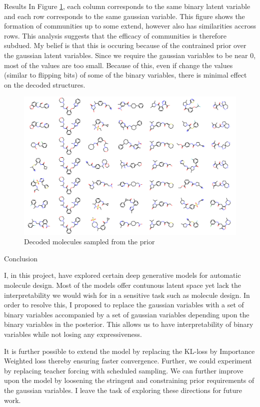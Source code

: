\documentclass{article}
\begin{document}
\begin{psection}{Results}
	In Figure \ref{fig:samples}, each column corresponds to the same binary latent variable and each row corresponds to the same gaussian variable. This figure shows the formation of communities up to some extend, however also has similarities accross rows. This analysis suggests that the efficacy of communities is therefore subdued. My belief is that this is occuring because of the contrained prior over the gaussian latent variables. Since we require the gaussian variables to be near 0, most of the values are too small. Because of this, even if change the values (similar to flipping bits) of some of the binary variables, there is minimal effect on the decoded structures.
	\begin{figure}[htpb]
		\centering
		\includegraphics[width=\textwidth]{includes/plots/plots.png}
		\caption{Decoded molecules sampled from the prior}
		\label{fig:samples}
	\end{figure}

\end{psection}

\begin{psection}{Conclusion}

	I, in this project, have explored certain deep generative models for automatic molecule design. Most of the models offer contunous latent space yet lack the interpretability we would wish for in a sensitive task such as molecule design. In order to resolve this, I proposed to replace the gaussian variables with a set of binary variables accompanied by a set of gaussian variables depending upon the binary variables in the posterior. This allows us to have interpretability of binary variables while not losing any expressiveness.

	It is further possible to extend the model by replacing the KL-loss by Importance Weighted loss thereby ensuring faster convergence. Further, we could experiment by replacing teacher forcing with scheduled sampling. We can further improve upon the model by loosening the stringent and constraining prior requirements of the gaussian variables. I leave the task of exploring these directions for future work.

\end{psection}



\end{document}
